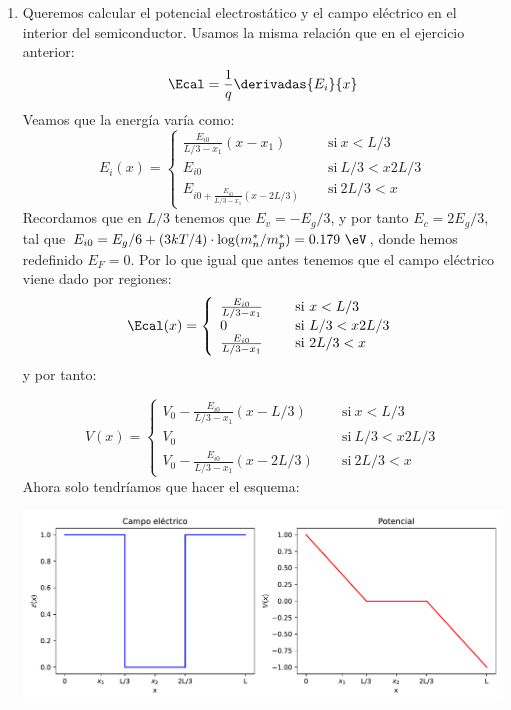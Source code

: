 	\begin{enumerate}[label=\alph*)]
		\item Queremos calcular el potencial electrostático y el campo eléctrico en el interior del semiconductor. Usamos la misma relación que en el ejercicio anterior:
		\begin{equation}
			\Ecal = \frac{1}{q} \derivadas{E_i}{x}
		\end{equation}
		Veamos que la energía varía como:
		\begin{equation}
			E_i(x) = \left\lbrace \begin{array}{ll}
				\frac{E_{i0}}{L/3-x_1} (x-x_1) \quad & \ \text{si} \ x<L/3 \\
				E_{i0} \quad & \ \text{si} \ L/3<x2L/3 \\
				E_{i0+\frac{E_{i0}}{L/3-x_1} (x-2L/3)} \quad & \ \text{si} \ 2L/3<x
			\end{array} \right.
		\end{equation}
		Recordamos que en $L/3$ tenemos que $E_v=-E_g/3$, y por tanto $E_c=2E_g/3$, tal que $E_{i0}=E_g/6+(3kT/4)\cdot \log(m_n^*/m_p^*)=0.179 \ \eV$, donde hemos redefinido $E_F=0$. Por lo que igual que antes tenemos que el campo eléctrico viene dado por regiones:
		\begin{equation}
			\Ecal(x) = \left\lbrace \begin{array}{ll}
				\frac{E_{i0}}{L/3-x_1} \quad & \ \text{si} \ x<L/3\\
				0 \quad & \ \text{si} \ L/3<x2L/3 \\
				\frac{E_{i0}}{L/3-x_1} \quad & \ \text{si} \ 2L/3<x
			\end{array} \right.
		\end{equation}
		y por tanto:

		\begin{equation}
			V(x) = \left\lbrace \begin{array}{ll}
				V_0 -\frac{E_{i0}}{L/3-x_1} (x-L/3) \quad & \ \text{si} \ x<L/3 \\
				V_0 \quad & \ \text{si} \ L/3<x2L/3 \\
				V_0 -\frac{E_{i0}}{L/3-x_1} (x-2L/3) \quad & \ \text{si} \ 2L/3<x
			\end{array} \right.
		\end{equation}
		Ahora solo tendríamos que hacer el esquema:
	
		\begin{center}
			\includegraphics[width=\linewidth]{Cuerpo/Ch_02/02_Ejercicio_16.pdf}
		\end{center}
			

\end{enumerate}
